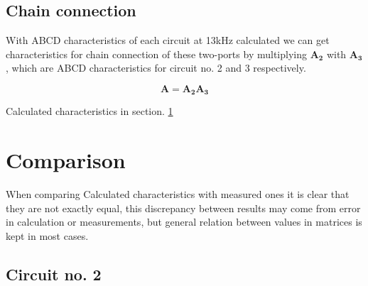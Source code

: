 \documentclass[notitlepage, a4paper, 11pt]{article}
\begin{document}
	
	\subsection{Chain connection}
	With ABCD characteristics of each circuit at 13kHz calculated we can get characteristics for chain connection of these two-ports by multiplying $\mathbf{A_2}$ with $\mathbf{A_3}$, which are ABCD characteristics for circuit no. 2 and 3 respectively.
	
	\begin{equation}
		\mathbf{A} = \mathbf{A_2} \mathbf{A_3}
	\end{equation}
	
	Calculated characteristics in section. \ref{sec:comparison}
		
	\section{Comparison}\label{sec:comparison}
	When comparing Calculated characteristics with measured ones it is clear that they are not exactly equal, this discrepancy between results may come from error in calculation or measurements, but general relation between values in matrices is kept in most cases.
	\subsection{Circuit no. 2}
	
\end{document}
